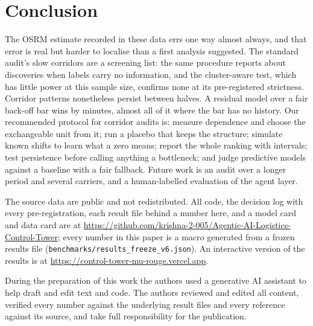 \documentclass[pdflatex,sn-basic]{sn-jnl}
\begin{document}
\section{Conclusion}\label{sec:conclusion}
The OSRM estimate recorded in these data errs one way almost always, and that error is real but harder to localise than a first analysis suggested. The standard audit's \fzBottlenecks{} slow corridors are a screening list: the same procedure reports about \fzAuditPlaceboDiscoveriesDpOne{} discoveries when labels carry no information, and the cluster-aware test, which has little power at this sample size, confirms none at its pre-registered strictness. Corridor patterns nonetheless persist between halves. A residual model over a fair back-off bar wins by \fzReportedVsBarDeltaDpTwo{} minutes, almost all of it where the bar has no history. Our recommended protocol for corridor audits is: measure dependence and choose the exchangeable unit from it; run a placebo that keeps the structure; simulate known shifts to learn what a zero means; report the whole ranking with intervals; test persistence before calling anything a bottleneck; and judge predictive models against a baseline with a fair fallback. Future work is an audit over a longer period and several carriers, and a human-labelled evaluation of the agent layer.

\backmatter

The source data are public and not redistributed. All code, the decision log with every pre-registration, each result file behind a number here, and a model card and data card are at \url{https://github.com/krishna-2-005/Agentic-AI-Logistics-Control-Tower}; every number in this paper is a macro generated from a frozen results file (\texttt{benchmarks/results\_freeze\_v6.json}). An interactive version of the results is at \url{https://control-tower-mu-rouge.vercel.app}.

During the preparation of this work the authors used a generative AI assistant to help draft and edit text and code. The authors reviewed and edited all content, verified every number against the underlying result files and every reference against its source, and take full responsibility for the publication.

{\footnotesize\setlength{\itemsep}{0pt}}
\end{document}

